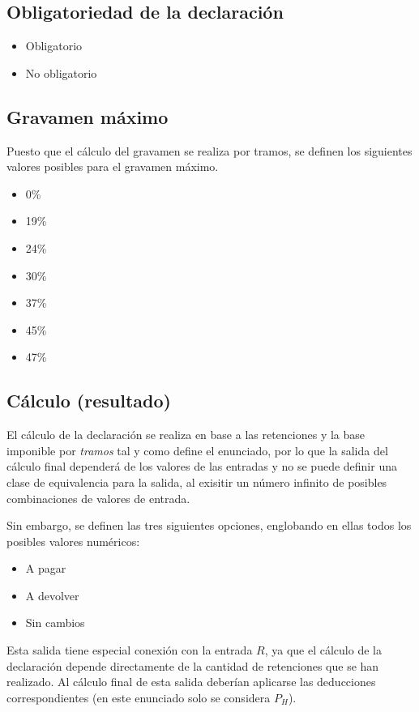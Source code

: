 \subsection{Obligatoriedad de la declaración}
\begin{itemize}
	\item Obligatorio
	\item No obligatorio
\end{itemize}

\subsection{Gravamen máximo}
Puesto que el cálculo del gravamen se realiza por tramos, se definen los siguientes
valores posibles para el gravamen máximo.

\begin{itemize}
	\item 0\%
	\item 19\%
	\item 24\%
	\item 30\%
	\item 37\%
	\item 45\%
	\item 47\%
\end{itemize}

\subsection{Cálculo (resultado)}
El cálculo de la declaración se realiza en base a las retenciones y la base imponible por \textit{tramos}
tal y como define el enunciado, por lo que la salida del cálculo final dependerá de los valores
de las entradas y no se puede definir una clase de equivalencia para la salida, al exisitir un número
infinito de posibles combinaciones de valores de entrada.

Sin embargo, se definen las tres siguientes opciones, englobando en ellas todos los posibles valores numéricos:
\begin{itemize}
	\item A pagar
	\item A devolver
	\item Sin cambios
\end{itemize}

Esta salida tiene especial conexión con la entrada $R$, ya que el cálculo de la declaración
depende directamente de la cantidad de retenciones que se han realizado. Al cálculo final de esta salida
deberían aplicarse las deducciones correspondientes (en este enunciado solo se considera $P_{H}$).
